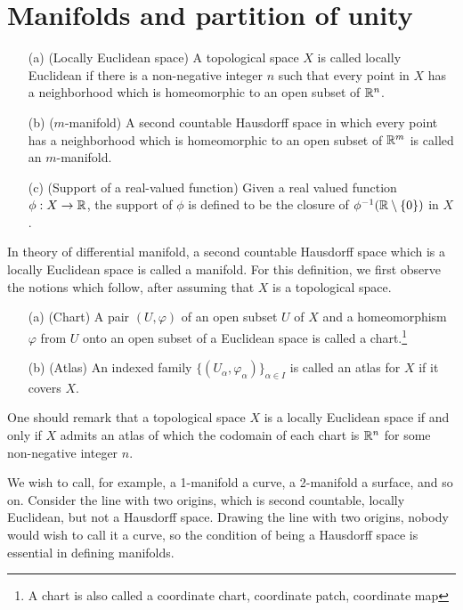 \section{Manifolds and partition of unity}

\begin{defi}
    \begin{enumerate}
        \item[(a)]
        {
            (Locally Euclidean space)
            A topological space $X$ is called locally Euclidean if there is a non-negative integer $n$ such that every point in $X$ has a neighborhood which is homeomorphic to an open subset of ${\mathbb{R}}^n$.
        }
        \item[(b)]
        {
            ($m$-manifold)
            A second countable Hausdorff space in which every point has a neighborhood which is homeomorphic to an open subset of ${\mathbb{R}}^m$ is called an $m$-manifold.
        }
        \item[(c)]
        {
            (Support of a real-valued function)
            Given a real valued function $\phi: X\rightarrow{\mathbb{R}}$, the support of $\phi$ is defined to be the closure of $\phi^{-1}({\mathbb{R}}\setminus\{0\})$ in $X$.
        }
    \end{enumerate}
\end{defi}
\begin{rmk}
    In theory of differential manifold, a second countable Hausdorff space which is a locally Euclidean space is called a manifold.
    For this definition, we first observe the notions which follow, after assuming that $X$ is a topological space.
    \begin{enumerate}
        \item[(a)]
        {
            (Chart)
            A pair $(U, \varphi)$ of an open subset $U$ of $X$ and a homeomorphism $\varphi$ from $U$ onto an open subset of a Euclidean space is called a chart.\footnote{A chart is also called a coordinate chart, coordinate patch, coordinate map}
        }
        \item[(b)]
        {
            (Atlas)
            An indexed family $\{(U_\alpha, \varphi_\alpha)\}_{\alpha\in I}$ is called an atlas for $X$ if it covers $X$.
        }
    \end{enumerate}
    One should remark that a topological space $X$ is a locally Euclidean space if and only if $X$ admits an atlas of which the codomain of each chart is ${\mathbb{R}}^n$ for some non-negative integer $n$.
\end{rmk}
\begin{rmk}
    We wish to call, for example, a 1-manifold a curve, a 2-manifold a surface, and so on.
    Consider the line with two origins, which is second countable, locally Euclidean, but not a Hausdorff space.
    Drawing the line with two origins, nobody would wish to call it a curve, so the condition of being a Hausdorff space is essential in defining manifolds.
\end{rmk}

